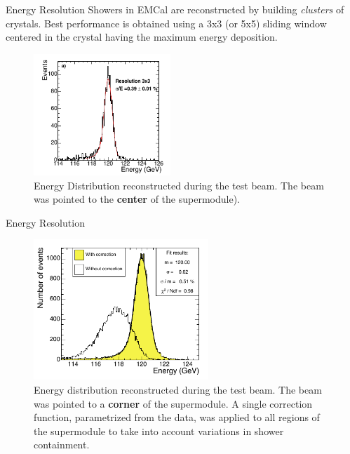 \documentclass[10pt]{beamer}
\begin{document}
\begin{frame}{Energy Resolution}
    Showers in EMCal are reconstructed by building \emph{clusters} of crystals. Best performance is obtained using a 3x3 (or 5x5) sliding window centered in the crystal having the maximum energy deposition.
    \begin{figure}
        \centering
        \includegraphics[height=130pt]{./img/resolution_1.png}
        \caption{Energy Distribution reconstructed during the test beam. The beam was pointed to the \textbf{center} of the supermodule).}
        \label{fig:res1}
    \end{figure}{}
\end{frame}

\begin{frame}{Energy Resolution}
    \begin{figure}
        \centering
        \includegraphics[height=150pt]{./img/resolution_2.png}
        \caption{Energy distribution reconstructed during the test beam. The beam was pointed to a \textbf{corner} of the supermodule. A single correction function, parametrized from the data, was applied to all regions of the supermodule to take into account variations in shower containment.}
        \label{fig:res2}
    \end{figure}{}
\end{frame}
\end{document}
